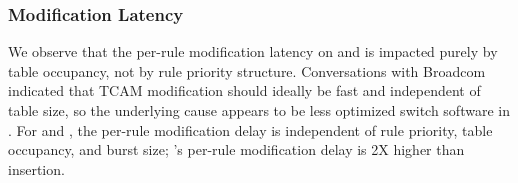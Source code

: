 \subsubsection{Modification Latency}

We observe that the per-rule modification latency on \BroadcomOne and \IBM is 
impacted purely by table occupancy, not by rule priority structure.
Conversations with Broadcom indicated that TCAM modification should ideally be fast and independent of table size,
so the underlying cause appears to be less optimized switch software in \BroadcomOne.
For \BroadcomThree and \Intel, the per-rule modification delay 
is independent of rule priority, table occupancy, and burst size;
\BroadcomThree's per-rule modification delay is 2X higher than insertion.

